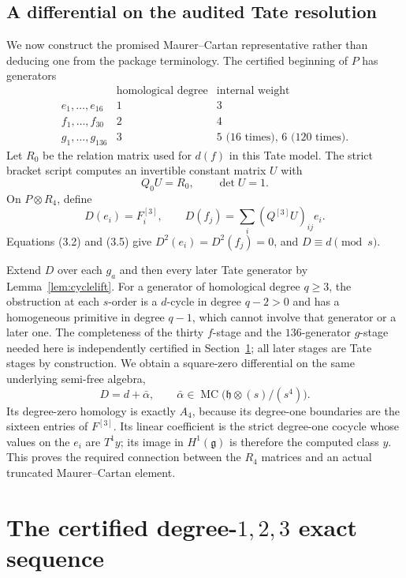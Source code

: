 \documentclass[11pt]{article}
\theoremstyle{definition}
\theoremstyle{remark}
\newcommand{\MC}{\operatorname{MC}}
\begin{document}
\subsection{A differential on the audited Tate resolution}

We now construct the promised Maurer--Cartan representative rather than
deducing one from the package terminology.  The certified beginning of $P$
has generators
\[
\begin{array}{c|c|c}
 &\text{homological degree}&\text{internal weight}\\ \hline
e_1,\ldots,e_{16}&1&3\\
f_1,\ldots,f_{30}&2&4\\
g_1,\ldots,g_{136}&3&5\text{ (16 times), }6\text{ (120 times).}
\end{array}                                                     \tag{3.4}
\]
Let $R_0$ be the relation matrix used for $d(f)$ in this Tate model.  The
strict bracket script computes an invertible constant matrix $U$ with
\[
 Q_0U=R_0,
 \qquad \det U=1.                                             \tag{3.5}
\]
On $P\otimes R_4$, define
\[
 D(e_i)=F_i^{[3]},
 \qquad
 D(f_j)=\sum_i(Q^{[3]}U)_{ij}e_i.                             \tag{3.6}
\]
Equations (3.2) and (3.5) give $D^2(e_i)=D^2(f_j)=0$, and
$D\equiv d\pmod s$.

Extend $D$ over each $g_a$ and then every later Tate generator by
Lemma~\ref{lem:cyclelift}.  For a generator of homological degree $q\geq3$,
the obstruction at each $s$-order is a $d$-cycle in degree $q-2>0$ and has a
homogeneous primitive in degree $q-1$, which cannot involve that generator or
a later one.  The
completeness of the thirty $f$-stage and the $136$-generator $g$-stage needed
here is independently certified in Section~\ref{sec:h3}; all later stages are
Tate stages by construction.  We obtain a square-zero differential on the
same underlying semi-free algebra,
\[
 D=d+\bar\alpha,
 \qquad
 \bar\alpha\in
 \MC\bigl(\mathfrak h\otimes(s)/(s^4)\bigr).                 \tag{3.7}
\]
Its degree-zero homology is exactly $A_4$, because its degree-one boundaries
are the sixteen entries of $F^{[3]}$.  Its linear coefficient is the strict
degree-one cocycle whose values on the $e_i$ are $T^1y$; its image in
$H^1(\mathfrak g)$ is therefore the computed class $y$.  This proves the
required connection between the $R_4$ matrices and an actual truncated
Maurer--Cartan element.

\section{The certified degree-\texorpdfstring{$1,2,3$}{1,2,3} exact
sequence}\label{sec:h3}
\end{document}

